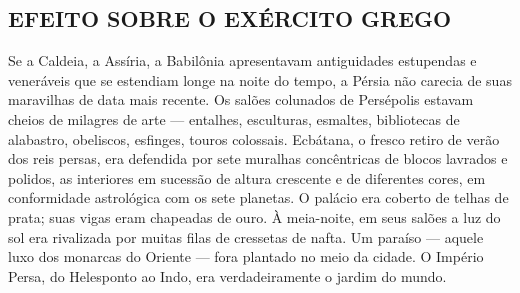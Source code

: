 \documentclass[11pt,a5paper,twoside,openany]{book}
\begin{document}
\subsection*{EFEITO SOBRE O EXÉRCITO GREGO}
Se a Caldeia, a Assíria, a Babilônia apresentavam antiguidades estupendas e veneráveis que se estendiam longe na noite do tempo, a Pérsia não carecia de suas maravilhas de data mais recente. Os salões colunados de Persépolis estavam cheios de milagres de arte — entalhes, esculturas, esmaltes, bibliotecas de alabastro, obeliscos, esfinges, touros colossais. Ecbátana, o fresco retiro de verão dos reis persas, era defendida por sete muralhas concêntricas de blocos lavrados e polidos, as interiores em sucessão de altura crescente e de diferentes cores, em conformidade astrológica com os sete planetas. O palácio era coberto de telhas de prata; suas vigas eram chapeadas de ouro. À meia-noite, em seus salões a luz do sol era rivalizada por muitas filas de cressetas de nafta. Um paraíso — aquele luxo dos monarcas do Oriente — fora plantado no meio da cidade. O Império Persa, do Helesponto ao Indo, era verdadeiramente o jardim do mundo.
\end{document}
